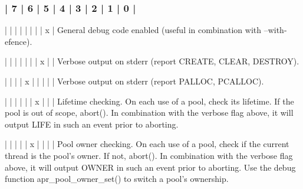 \begin{DoxyPre}
\subsubsection*{| 7 | 6 | 5 | 4 | 3 | 2 | 1 | 0 |
}\end{DoxyPre}



\begin{DoxyPre}
|   |   |   |   |   |   |   | x |  General debug code enabled (useful in
                                   combination with --with-efence).\end{DoxyPre}



\begin{DoxyPre}|   |   |   |   |   |   | x |   |  Verbose output on stderr (report
                                   CREATE, CLEAR, DESTROY).\end{DoxyPre}



\begin{DoxyPre}|   |   |   | x |   |   |   |   |  Verbose output on stderr (report
                                   PALLOC, PCALLOC).\end{DoxyPre}



\begin{DoxyPre}|   |   |   |   |   | x |   |   |  Lifetime checking. On each use of a
                                   pool, check its lifetime.  If the pool
                                   is out of scope, abort().
                                   In combination with the verbose flag
                                   above, it will output LIFE in such an
                                   event prior to aborting.\end{DoxyPre}



\begin{DoxyPre}|   |   |   |   | x |   |   |   |  Pool owner checking.  On each use of a
                                   pool, check if the current thread is the
                                   pool's owner.  If not, abort().  In
                                   combination with the verbose flag above,
                                   it will output OWNER in such an event
                                   prior to aborting.  Use the debug
                                   function apr\_pool\_owner\_set() to switch
                                   a pool's ownership.\end{DoxyPre}



